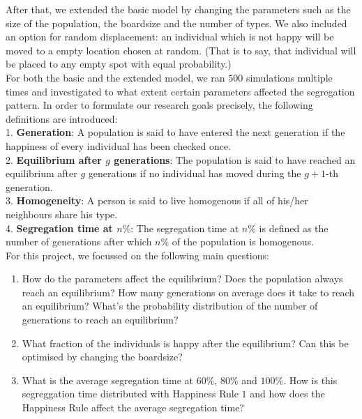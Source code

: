 After that, we extended the basic model by changing the parameters such as the size of the population, the boardsize and the number of types. 
We also included an option for random displacement: an individual which is not happy will be moved to a empty location chosen at random. 
(That is to say, that individual will be placed to any empty spot with equal probability.)\\

For both the basic and the extended model, we ran $500$ simulations multiple times and investigated to what extent certain parameters affected the segregation pattern. 
In order to formulate our research goals precisely, the following definitions are introduced:\\
1. \textbf{Generation}: 
A population is said to have entered the next generation if the happiness of every individual has been checked once. \\
2. \textbf{Equilibrium after \(g\) generations}: 
The population is said to have reached an equilibrium after \(g\) generations if no individual has moved during the \(g+1\)-th generation.\\
3. \textbf{Homogeneity}:
A person is said to live homogenous if all of his/her neighbours share his type.\\
4. \textbf{Segregation time at $n\%$}: 
The segregation time at $n\%$ is defined as the number of generations after which $n\%$ of the population is homogenous.\\
\newpage
For this project, we focussed on the following main questions:
\begin{enumerate}
	\item How do the parameters affect the equilibrium? 
	Does the population always reach an equilibrium? 
	How many generations on average does it take to reach an equilibrium? 
	What's the probability distribution of the number of generations to reach an equilibrium?

	\item What fraction of the individuals is happy after the equilibrium? 
	Can this be optimised by changing the boardsize?
	
	\item What is the average segregation time at \(60\%\), \(80\%\) and \(100\%\). 
	How is this segreggation time distributed with Happiness Rule \(1\) and how does the Happiness Rule affect the average segregation time?
\end{enumerate}

